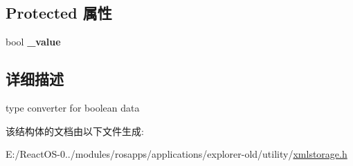 \subsection*{Protected 属性}
\begin{DoxyCompactItemize}
\item 
\mbox{\label{struct_x_m_l_storage_1_1_x_m_l_bool_a866240fca63ca4a3677a01d9eada1f27}} 
bool {\bfseries \+\_\+value}
\end{DoxyCompactItemize}


\subsection{详细描述}
type converter for boolean data 

该结构体的文档由以下文件生成\+:\begin{DoxyCompactItemize}
\item 
E\+:/\+React\+O\+S-\/0../modules/rosapps/applications/explorer-\/old/utility/\hyperlink{xmlstorage_8h}{xmlstorage.\+h}\end{DoxyCompactItemize}
